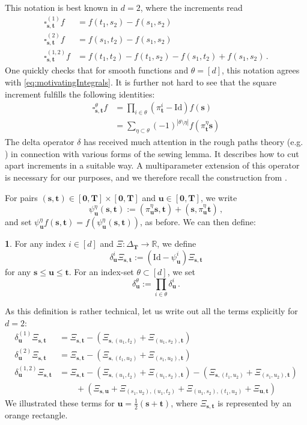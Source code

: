 \documentclass[11pt,oneside,english,reqno]{amsart}
\numberwithin{equation}{section}
\numberwithin{figure}{section}
\theoremstyle{plain}
\theoremstyle{definition}
\newtheorem{defn}[thm]{\protect\definitionname}
\theoremstyle{remark}
\theoremstyle{plain}
\theoremstyle{plain}
\theoremstyle{plain}
\theoremstyle{plain}
\theoremstyle{plain}
\providecommand{\definitionname}{Definition}
\newcommand{\RR}{\mathbb{R}}
\newcommand{\bT}{\mathbf{T}}
\newcommand{\boo}{\mathbf{0}}
\newcommand{\bu}{\mathbf{u}}
\newcommand{\bs}{\mathbf{s}}
\newcommand{\bt}{\mathbf{t}}
\newcommand{\Id}{\mathrm{Id}}
\newcommand{\abs}[1]{\left\lvert #1\right\rvert}
\begin{document}
\noindent This notation is best known in $d=2$, where the increments read
%
\begin{align*}
    \square_{\bs,\bt}^{(1)} f &= f(t_1,s_2)-f(s_1,s_2)\\
    \square_{\bs,\bt}^{(2)} f &= f(s_1,t_2)-f(s_1,s_2)\\
    \square_{\bs,\bt}^{(1,2)} f &= f(t_1,t_2)-f(t_1,s_2)-f(s_1,t_2)+f(s_1,s_2)\,.
\end{align*} 
%
One quickly checks that for smooth functions and $\theta = [d]$, this notation agrees with \eqref{eq:motivatingIntegrals}. It is further not hard to see that the square increment fulfills the following identities:
%
\begin{align*}
    \square_{\bs,\bt}^\theta f &= \prod_{i\in\theta}(\pi_\bt^i-\Id)f(\bs)\\
    &=\sum_{\eta\subset\theta} (-1)^{\abs{\theta\setminus\eta}}f(\pi^\eta_\bt\bs)
\end{align*}
%
The delta operator $\delta$ has received much attention in the rough paths theory (e.g. \cite{frizhairer}) in connection with various forms of the sewing lemma. It describes how to cut apart increments in a suitable way. A multiparameter extension of this operator is necessary for our purposes, and we therefore recall the construction from \cite{HARANG202134}.

For pairs $(\bs,\bt)\in[\boo,\bT]\times[\boo,\bT]$ and $\bu\in[\boo,\bT]$, we write
%
\begin{equation}
    \psi^\eta_\bu (\bs,\bt) := (\pi^\eta_\bu\bs,\bt) + (\bs,\pi^\eta_\bu\bt)\,,
\end{equation}
%
and set $\psi_\bu^\eta f(\bs,\bt) = f(\psi_\bu^\eta(\bs,\bt))$, as before. We can then define:

\begin{defn}
    For any index $i\in[d]$ and $\Xi:\Delta_\bT\to\RR$, we define
%
    \begin{equation*}
        \delta^i_{\bu}\Xi_{\bs,\bt} := (\Id-\psi^i_\bu)\Xi_{\bs,\bt}
    \end{equation*}
%
    for any $\bs\le\bu\le\bt$. For an index-set $\theta\subset[d]$, we set
%
    \begin{equation*}
        \delta^\theta_\bu := \prod_{i\in\theta}\delta^i_\bu\,.
    \end{equation*}
\end{defn}

\noindent As this definition is rather technical, let us write out all the terms explicitly for $d=2$:
%
\begin{align*}
    \delta_\bu^{(1)}\Xi_{\bs,\bt} &= \Xi_{\bs,\bt}-(\Xi_{\bs,(u_1,t_2)}+\Xi_{(u_1,s_2),\bt})\\
    \delta_\bu^{(2)}\Xi_{\bs,\bt} &= \Xi_{\bs,\bt}-(\Xi_{\bs,(t_1,u_2)}+\Xi_{(s_1,u_2),\bt})\\
    \delta_\bu^{(1,2)}\Xi_{\bs,\bt} &= \Xi_{\bs,\bt}-(\Xi_{\bs,(u_1,t_2)}+\Xi_{(u_1,s_2),\bt})-(\Xi_{\bs,(t_1,u_2)}+\Xi_{(s_1,u_2),\bt})\\
    &\qquad+ (\Xi_{\bs,\bu}+\Xi_{(s_1,u_2),(u_1,t_2)}+\Xi_{(u_1,s_2),(t_1,u_2)}+\Xi_{\bu,\bt})
\end{align*}
%
We illustrated these terms for $\bu = \frac 12(\bs+\bt)$, where $\Xi_{\bs,\bt}$ is represented by an orange rectangle.
\end{document}
